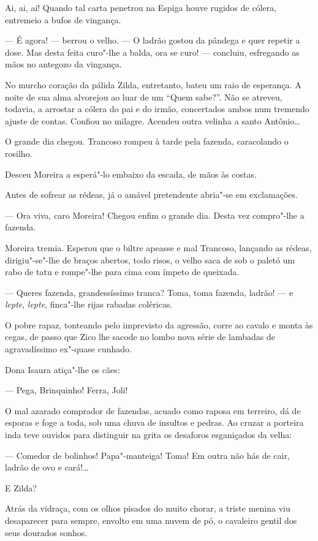 Ai, ai, ai! Quando tal carta penetrou na Espiga houve rugidos de cólera,
entremeio a bufos de vingança.

--- É agora! --- berrou o velho. --- O ladrão gostou da pândega e quer
repetir a dose. Mas desta feita curo"-lhe a balda, ora se curo! ---
concluiu, esfregando as mãos no antegozo da vingança.

No murcho coração da pálida Zilda, entretanto, bateu um raio de
esperança. A noite de sua alma alvorejou ao luar de um ``Quem sabe?''.
Não se atreveu, todavia, a arrostar a cólera do pai e do irmão,
concertados ambos num tremendo ajuste de contas. Confiou no milagre.
Acendeu outra velinha a santo Antônio\ldots{}

O grande dia chegou. Trancoso rompeu à tarde pela fazenda, caracolando o
rosilho.

Desceu Moreira a esperá"-lo embaixo da escada, de mãos às costas.

Antes de sofrear as rédeas, já o amável pretendente abria"-se em
exclamações.

--- Ora viva, caro Moreira! Chegou enfim o grande dia. Desta vez
compro"-lhe a fazenda.

Moreira tremia. Esperou que o biltre apeasse e mal Trancoso, lançando as
rédeas, dirigiu"-se"-lhe de braços abertos, todo risos, o velho saca de
sob o paletó um rabo de tatu e rompe"-lhe para cima com ímpeto de
queixada.

--- Queres fazenda, grandessíssimo tranca? Toma, toma fazenda, ladrão!
--- e \emph{lepte}, \emph{lepte}, finca"-lhe rijas rabadas coléricas.

O pobre rapaz, tonteando pelo imprevisto da agressão, corre ao cavalo e
monta às cegas, de passo que Zico lhe sacode no lombo nova série de
lambadas de agravadíssimo ex"-quase cunhado.

Dona Isaura atiça"-lhe os cães:

--- Pega, Brinquinho! Ferra, Joli!

O mal azarado comprador de fazendas, acuado como raposa em terreiro, dá
de esporas e foge a toda, sob uma chuva de insultos e pedras. Ao cruzar
a porteira inda teve ouvidos para distinguir na grita os desaforos
esganiçados da velha:

--- Comedor de bolinhos! Papa"-manteiga! Toma! Em outra não hás de cair,
ladrão de ovo e cará!\ldots{}

E Zilda?

Atrás da vidraça, com os olhos pisados do muito chorar, a triste menina
viu desaparecer para sempre, envolto em uma nuvem de pó, o cavaleiro
gentil dos seus dourados sonhos.

